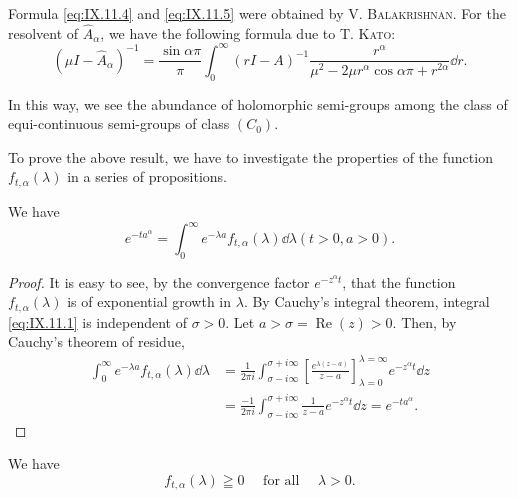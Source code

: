 Formula \eqref{eq:IX.11.4} and \eqref{eq:IX.11.5} were obtained by V. \textsc{Balakrishnan}. For the resolvent of $\hat{A}_{\alpha}$, we have the following formula due to T. \textsc{Kato}: 
\begin{equation}\label{eq:IX.11.6}
(\mu I - \hat {A} _{\alpha}) ^{-1} = \frac {\sin \alpha \pi}{\pi} \int_{0} ^{\infty} (r I - A) ^{-1} \frac {r ^{\alpha}}{\mu^{2} - 2 \mu r ^{\alpha} \cos \alpha \pi + r ^{2 \alpha}} \dd r.
\end{equation}

In this way, we see the abundance of holomorphic semi-groups among the class of equi-continuous semi-groups of class $(C_{0})$. 

To prove the above result, we have to investigate the properties of the function $f_{t,\alpha}(\lambda)$ in a series of propositions. 

\begin{proposition}\label{prop:IX.11.Proposition.1} We have 
\begin{equation}\label{eq:IX.11.7}
e ^ {- t a ^{\alpha}} = \int_{0} ^{\infty} e ^{- \lambda a} f _{t, \alpha} (\lambda) \dd \lambda (t > 0, a > 0).
\end{equation}
\end{proposition}

\begin{proof}
 It is easy to see, by the convergence factor $e^{-z^{\alpha}t}$, that the function $f_{t,\alpha}(\lambda)$ is of exponential growth in $\lambda$. By Cauchy's integral theorem, integral \eqref{eq:IX.11.1} is independent of $\sigma > 0$. Let $a > \sigma = \operatorname{Re}(z) > 0$. Then, by Cauchy's theorem of residue, 
\[ \begin{aligned} \int_{0} ^{\infty} e ^{- \lambda a} f _{t, \alpha} (\lambda) \dd \lambda & = \frac {1}{2 \pi i} \int_{\sigma - i \infty} ^{\sigma + i \infty} \left[ \frac {e ^{\lambda (z - a)}}{z - a} \right] _{\lambda = 0} ^{\lambda = \infty} e ^ {- z ^{\alpha} t} \dd z \\ & = \frac {- 1}{2 \pi i} \int_{\sigma - i \infty} ^{\sigma + i \infty} \frac {1}{z - a} e ^ {- z ^{\alpha} t} \dd z = e ^ {- t a ^{\alpha}}. \end{aligned}
\]
\end{proof}

\begin{proposition}\label{prop:IX.11.Proposition.2} We have 
\begin{equation}\label{eq:IX.11.8}
f _{t, \alpha} (\lambda) \geqq 0 \quad \text{ for all } \quad \lambda > 0.
\end{equation}
\end{proposition}

